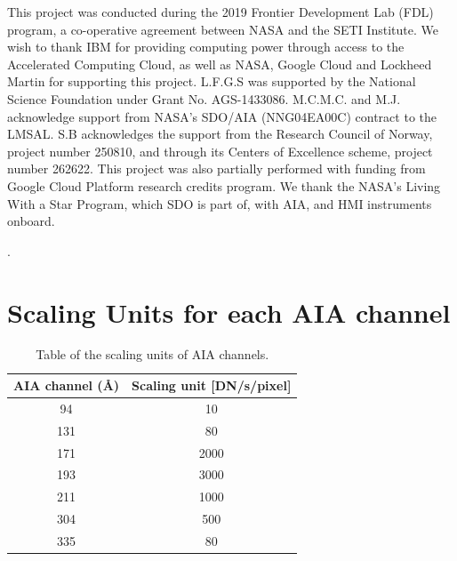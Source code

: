 \documentclass[twocolumn,usenames,dvipsnames]{aastex63}
\begin{document}
\acknowledgments
{This project was conducted during the 2019 Frontier Development Lab (FDL) program, a co-operative agreement between NASA and the SETI Institute. We wish to thank IBM for providing computing power through access to the Accelerated Computing Cloud, as well as NASA, Google Cloud and Lockheed Martin for supporting this project. L.F.G.S was supported by the National Science Foundation under Grant No. AGS-1433086. M.C.M.C. and M.J. acknowledge support from NASA’s SDO/AIA (NNG04EA00C) contract to the LMSAL. S.B  acknowledges the support from the Research Council of Norway, project number 250810, and through its Centers of Excellence scheme, project number 262622. This project was also partially performed with funding from Google Cloud Platform research credits program. We thank the NASA’s Living With a Star Program, which SDO is part of, with AIA, and HMI instruments onboard.

.}






\newpage
\appendix
\section{Scaling Units for each AIA channel}
\label{section:appendix_average}

\begin{table}[ht]
  \centering
  \caption{Table of the scaling units of  AIA channels.}
  \label{tab:average_channels}
  \begin{tabular}{cc}
    \toprule
     AIA channel (\AA) &  Scaling unit [DN/s/pixel] \\
     \midrule
       94 &   10  \\
      131 &   80  \\
      171 & 2000  \\
      193 & 3000  \\
      211 & 1000  \\
      304 &  500  \\
      335 &   80  \\
      \bottomrule
  \end{tabular}
\end{table}
\end{document}
